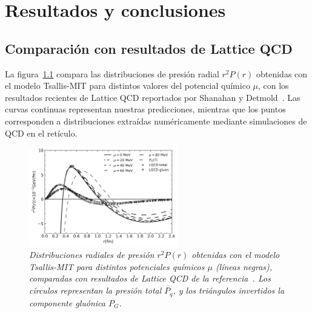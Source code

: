 \chapter{Resultados y conclusiones}

\pagestyle{fancy}
\fancyhf{}
\fancyhead[LE]{\nouppercase{\textbf{\leftmark}\hfill\textit{\rightmark}}}
\fancyhead[RO]{\nouppercase{\textit{\rightmark}\hfill\textbf{\leftmark}}}

\section{Comparación con resultados de Lattice QCD}

La figura~\ref{fig:Results_LQCD} compara las distribuciones de presión radial \( r^2 P(r) \) obtenidas con el modelo Tsallis-MIT para distintos valores del potencial químico \( \mu \), con los resultados recientes de Lattice QCD reportados por Shanahan y Detmold~\cite{shanahanPressureDistributionShear2019}. Las curvas continuas representan nuestras predicciones, mientras que los puntos corresponden a distribuciones extraídas numéricamente mediante simulaciones de QCD en el retículo.

\begin{figure}
    \centering
    \includegraphics[width=0.58\textwidth]{./Images/MIT-BagModel.png}
    \caption[Comparación de presión radial con Lattice QCD]{\emph{Distribuciones radiales de presión \( r^2 P(r) \) obtenidas con el modelo Tsallis-MIT para distintos potenciales químicos \( \mu \) (líneas negras), comparadas con resultados de Lattice QCD de la referencia~\cite{shanahanPressureDistributionShear2019}. Los círculos representan la presión total \( P_q \), y los triángulos invertidos la componente gluónica \( P_G \).}}
    \label{fig:Results_LQCD}
\end{figure}

